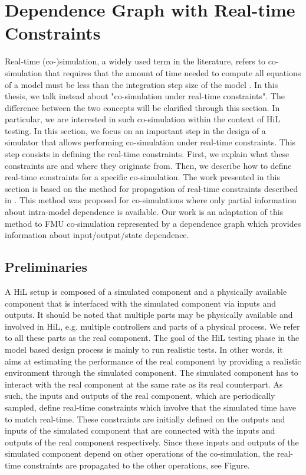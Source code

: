 \section{\label{sec:grphrtsc}Dependence Graph with Real-time Constraints}

Real-time (co-)simulation, a widely used term in the literature, refers to co-simulation that requires that the amount of time needed to compute all equations of a model must be less than the integration step size of the model \cite{belanger:2010}. In this thesis, we talk instead about "co-simulation under real-time constraints". The difference between the two concepts will be clarified through this section. In particular, we are interested in such co-simulation within the context of HiL testing. In this section, we focus on an important step in the design of a simulator that allows performing co-simulation under real-time constraints. This step consists in defining the real-time constraints. First, we explain what these constraints are and where they originate from. Then, we describe how to define real-time constraints for a specific co-simulation. The work presented in this section is based on the method for propagation of real-time constraints described in \cite{faure:2011}. This method was proposed for co-simulations where only partial information about intra-model dependence is available. Our work is an adaptation of this method to FMU co-simulation represented by a dependence graph which provides information about input/output/state dependence.

\subsection{Preliminaries}

A HiL setup is composed of a simulated component and a physically available component that is interfaced with the simulated component via inputs and outputs. It should be noted that multiple parts may be physically available and involved in HiL, e.g. multiple controllers and parts of a physical process. We refer to all these parts as the real component.
The goal of the HiL testing phase in the model based design process is mainly to run realistic tests. In other words, it aims at estimating the performance of the real component by providing a realistic environment through the simulated component. The simulated component has to interact with the real component at the same rate as its real counterpart. As such, the inputs and outputs of the real component, which are periodically sampled, define real-time constraints which involve that the simulated time have to match real-time. These constraints are initially defined on the outputs and inputs of the simulated component that are connected with the inputs and outputs of the real component respectively. Since these inputs and outputs of the simulated component depend on other operations of the co-simulation, the real-time constraints are propagated to the other operations, see Figure.

